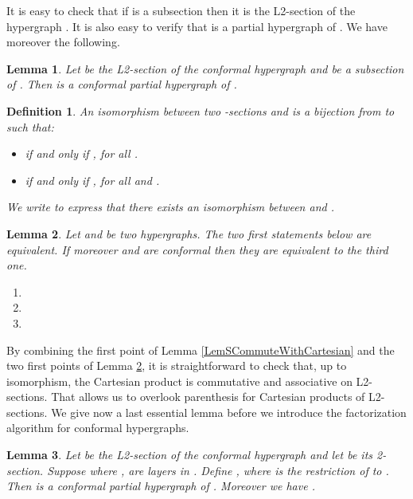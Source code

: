 \documentclass[copyright]{eptcs}
\newtheorem{Def}{Definition}
\newtheorem{Lem}{Lemma}
\newcommand{\chg}[1]{{#1}}
\begin{document}
It is easy to check that if  is a subsection then it is
the L2-section of the hypergraph . It
is also easy to verify that  is a partial hypergraph of .
We have moreover the following.

\begin{Lem}\label{LmSubsectionConformal} Let  be the L2-section of the conformal hypergraph  and  be a subsection of . Then  is a conformal partial hypergraph of .
\end{Lem}



\begin{Def}\label{DfIsomorphismL2Section} An isomorphism between two -sections  and  is a bijection  from \chg{} to \chg{} such that:
\begin{itemize}
 \item  if and only if , for all .
 \item  if and only if , for all  and .
\end{itemize}
We write  to express that there exists an isomorphism between  and .
\end{Def}


\begin{Lem}\label{LmIsoEquivSection} Let  and  be two hypergraphs. The two first statements below are equivalent. If moreover  and  are conformal then they are equivalent to the third one.
\begin{enumerate}
 \item 
 \item 
 \item 
\end{enumerate}
\end{Lem}


By combining the first point of Lemma
\ref{LemSCommuteWithCartesian} and the two first points of Lemma
\ref{LmIsoEquivSection}, it is straightforward to check that, up
to isomorphism, the Cartesian product is commutative and
associative on L2-sections. That allows us to overlook parenthesis
for Cartesian products of L2-sections. We give now a last
essential lemma before we introduce the factorization algorithm
for conformal hypergraphs.

\begin{Lem}\label{LmPassageAuProduitEtiquetage} Let  be the L2-section of the conformal hypergraph  and let  be its 2-section. Suppose  where \chg{, } are \chg{layers in} . Define  , where  is the restriction of  to . Then  is a conformal partial hypergraph of . Moreover we have .
\end{Lem}
\end{document}
